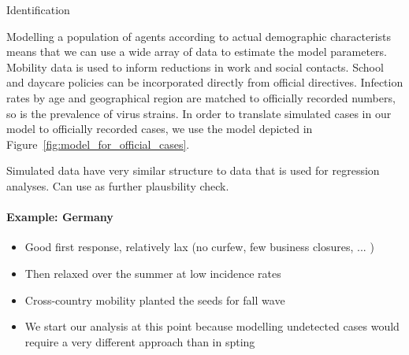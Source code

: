 Identification

Modelling a population of agents according to actual demographic characterists means that we can use a wide array of data to estimate the model parameters. Mobility data is used to inform reductions in work and social contacts. School and daycare policies can be incorporated directly from official directives. Infection rates by age and geographical region are matched to officially recorded numbers, so is the prevalence of virus strains. In order to translate simulated cases in our model to officially recorded cases, we use the model depicted in Figure~\ref{fig:model_for_official_cases}. 

Simulated data have very similar structure to data that is used for regression analyses. Can use as further plausbility check.

\paragraph{Example: Germany}
\begin{itemize}
    \item Good first response, relatively lax (no curfew, few business closures, ... )
    \item Then relaxed over the summer at low incidence rates
    \item Cross-country mobility planted the seeds for fall wave
    \item We start our analysis at this point because modelling undetected cases would require a very different approach than in spting
\end{itemize}


